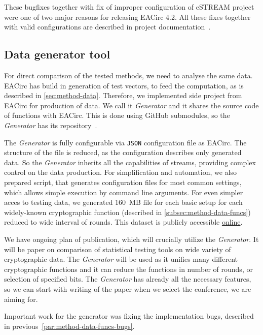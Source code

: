 \documentclass[
  print, %
  Table,   %
  nolof,     %
  nolot,     %
  11pt, %
  oneside  %
]{fithesis3}
\begin{document}
These bugfixes together with fix of improper configuration of eSTREAM project were one of two major reasons for releasing EACirc 4.2. All these fixes together with valid configurations are described in project documentation~\cite{EACirc-wiki-streams}.

\subsection{Data generator tool}
\label{subsec:method-data-generator}

For direct comparison of the tested methods, we need to analyse the same data. EACirc has build in generation of test vectors, to feed the computation, as is described in \cref{sec:method-data}. Therefore, we implemented side project from EACirc for production of data. We call it \textit{Generator} and it shares the source code of functions with EACirc. This is done using GitHub submodules, so the \textit{Generator} has its repository~\cite{EACircStreams}.

The \textit{Generator} is fully configurable via \texttt{JSON} configuration file as EACirc. The structure of the file is reduced, as the configuration describes only generated data. So the \textit{Generator} inherits all the capabilities of streams, providing complex control on the data production. For simplification and automation, we also prepared script, that generates configuration files for most common settings, which allows simple execution by command line arguments. For even simpler acces to testing data, we generated 160~MB file for each basic setup for each widely-known cryptographic function (described in \cref{subsec:method-data-funcs}) reduced to wide interval of rounds. This dataset is publicly accessible \href{https://drive.google.com/drive/folders/0B5Z1zst5NzwXQmFKaXgxREJWNk0?usp=sharing}{online}.

We have ongoing plan of publication, which will crucially utilize the \textit{Generator}. It will be paper on comparison of statistical testing tools on wide variety of cryptographic data. The \textit{Generator} will be used as it unifies many different cryptographic functions and it can reduce the functions in number of rounds, or selection of specified bits. The \textit{Generator} has already all the necessary features, so we can start with writing of the paper when we select the conference, we are aiming for.

Important work for the generator was fixing the implementation bugs, described in previous~\cref{par:method-data-funcs-bugs}.
\end{document}
